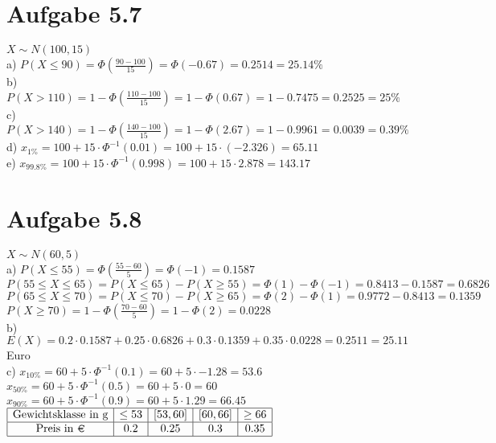 \documentclass{article}
\begin{document}
	\section*{Aufgabe 5.7}
		$X \sim N(100, 15)$ \\
		\newline
		a) $P(X \leq 90) = \Phi(\frac{90-100}{15}) = \Phi(-0.67) = 0.2514 = 25.14\%$ \\
		\newline
		b) $P(X > 110) = 1 - \Phi(\frac{110-100}{15}) = 1 - \Phi(0.67) = 1 - 0.7475 = 0.2525 = 25\%$ \\
		\newline
		c)  $P(X > 140) = 1 - \Phi(\frac{140-100}{15}) = 1 - \Phi(2.67) = 1 - 0.9961 = 0.0039 = 0.39\%$ \\
		\newline
		d) $x_{1\%} = 100 + 15 \cdot \Phi^{-1}(0.01) = 100 + 15 \cdot (-2.326) = 65.11$ \\
		\newline
		e)  $x_{99.8\%} = 100 + 15 \cdot \Phi^{-1}(0.998) = 100 + 15 \cdot 2.878 = 143.17$ 
	
	\section*{Aufgabe 5.8}
		$X \sim N(60, 5)$ \\
		\newline
		a) $P(X \leq 55) = \Phi(\frac{55-60}{5}) = \Phi(-1) = 0.1587$ \\
		\newline
		$P(55 \leq X \leq 65) = P(X \leq 65) - P(X \geq 55) = \Phi(1) - \Phi(-1) = 0.8413 - 0.1587 = 0.6826$ \\
		\newline
		$P(65 \leq X \leq 70) = P(X \leq 70) - P(X \geq 65) = \Phi(2) - \Phi(1) = 0.9772 - 0.8413 = 0.1359$ \\
		\newline
		$P(X \geq 70) = 1 - \Phi(\frac{70-60}{5}) = 1 - \Phi(2) = 0.0228$ \\
		\newline
		b) $E(X) = 0.2 \cdot 0.1587 + 0.25 \cdot 0.6826 +0.3 \cdot  0.1359 + 0.35 \cdot 0.0228 = 0.2511 = 25.11$ Euro \\
		\newline
		c) $x_{10\%} = 60 + 5 \cdot \Phi^{-1}(0.1) = 60 + 5 \cdot -1.28 = 53.6$ \\
		\newline
		$x_{50\%} = 60 + 5 \cdot \Phi^{-1}(0.5) = 60 + 5 \cdot 0 = 60$ \\
		\newline
		$x_{90\%} = 60 + 5 \cdot \Phi^{-1}(0.9) = 60 + 5 \cdot 1.29 = 66.45 $ \\
		\newline
			\(
		\begin{array}{|c|c|c|c|c|c|c|c|}
			\hline
			\text{Gewichtsklasse in g} & \leq53 & [53, 60] & [60, 66] & \geq 66 \\
			\hline
			\text{Preis in \EurCr} & 0.2 & 0.25 & 0.3 & 0.35 \\
			\hline
		\end{array}
		\) \\
		
\end{document}
